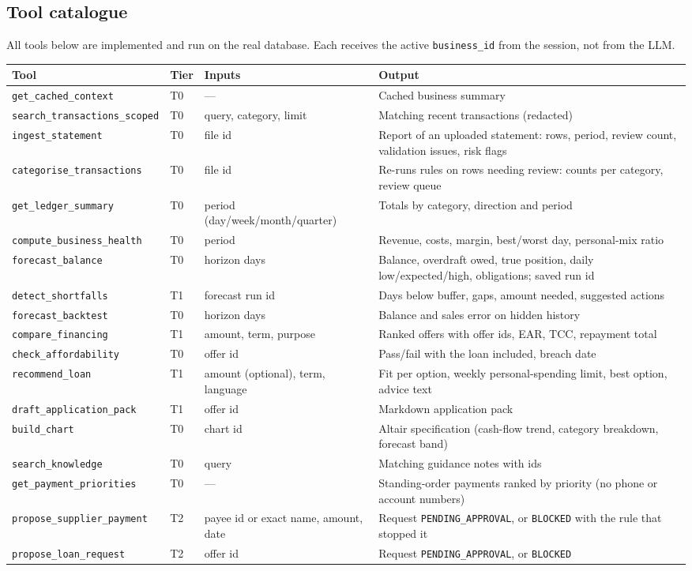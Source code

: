\documentclass[10pt,a4paper]{article}
\newcommand{\code}[1]{\texttt{\small #1}}
\begin{document}
\subsection{Tool catalogue}
All tools below are implemented and run on the real database. Each receives the active \code{business\_id} from the session, not from the LLM.
\begingroup\footnotesize
\begin{longtable}{@{}p{4.1cm}p{0.8cm}p{3.6cm}p{6.3cm}@{}}
\toprule
\textbf{Tool} & \textbf{Tier} & \textbf{Inputs} & \textbf{Output}\\
\midrule\endhead
\code{get\_cached\_context} & T0 & --- & Cached business summary\\
\code{search\_transactions\_scoped} & T0 & query, category, limit & Matching recent transactions (redacted)\\
\code{ingest\_statement} & T0 & file id & Report of an uploaded statement: rows, period, review count, validation issues, risk flags\\
\code{categorise\_transactions} & T0 & file id & Re-runs rules on rows needing review: counts per category, review queue\\
\code{get\_ledger\_summary} & T0 & period (day/week/month/quarter) & Totals by category, direction and period\\
\code{compute\_business\_health} & T0 & period & Revenue, costs, margin, best/worst day, personal-mix ratio\\
\code{forecast\_balance} & T0 & horizon days & Balance, overdraft owed, true position, daily low/expected/high, obligations; saved run id\\
\code{detect\_shortfalls} & T1 & forecast run id & Days below buffer, gaps, amount needed, suggested actions\\
\code{forecast\_backtest} & T0 & horizon days & Balance and sales error on hidden history\\
\code{compare\_financing} & T1 & amount, term, purpose & Ranked offers with offer ids, EAR, TCC, repayment total\\
\code{check\_affordability} & T0 & offer id & Pass/fail with the loan included, breach date\\
\code{recommend\_loan} & T1 & amount (optional), term, language & Fit per option, weekly personal-spending limit, best option, advice text\\
\code{draft\_application\_pack} & T1 & offer id & Markdown application pack\\
\code{build\_chart} & T0 & chart id & Altair specification (cash-flow trend, category breakdown, forecast band)\\
\code{search\_knowledge} & T0 & query & Matching guidance notes with ids\\
\code{get\_payment\_priorities} & T0 & --- & Standing-order payments ranked by priority (no phone or account numbers)\\
\code{propose\_supplier\_payment} & T2 & payee id or exact name, amount, date & Request \code{PENDING\_APPROVAL}, or \code{BLOCKED} with the rule that stopped it\\
\code{propose\_loan\_request} & T2 & offer id & Request \code{PENDING\_APPROVAL}, or \code{BLOCKED}\\
\bottomrule
\end{longtable}
\end{document}
